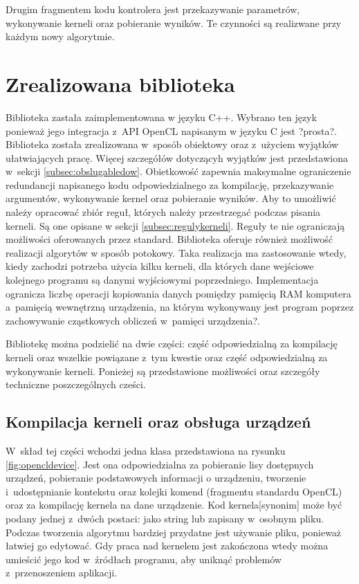 Drugim fragmentem kodu kontrolera jest przekazywanie parametrów, wykonywanie kerneli oraz pobieranie wyników. Te czynności są realizwane przy każdym nowy algorytmie.

\section{Zrealizowana biblioteka}  
\label{sec:biblioteka}

Biblioteka zastała zaimplementowana w języku C++. Wybrano ten język ponieważ jego integracja z~API OpenCL napisanym w języku C jest ?prosta?. Biblioteka została zrealizowana w~sposób obiektowy oraz z~użyciem wyjątków ułatwiających pracę. Więcej szczegółów dotyczącyh wyjątków jest przedstawiona w~sekcji \ref{subsec:obslugabledow}. Obietkowość zapewnia maksymalne ograniczenie redundancji napisanego kodu odpowiedzialnego za kompilację, przekazywanie argumentów, wykonywanie kernel oraz pobieranie wyników. Aby to umożliwić należy opracować zbiór reguł, których należy przestrzegać podczas pisania kerneli. Są one opisane w sekcji \ref{subsec:regulykerneli}. Reguły te nie ograniczają możliwości oferowanych przez standard. Biblioteka oferuje również możliwość realizacji algorytów w sposób potokowy. Taka realizacja ma zastosowanie wtedy, kiedy zachodzi potrzeba użycia kilku kerneli, dla których dane wejściowe kolejnego programu są danymi wyjściowymi poprzedniego. Implementacja  ogranicza liczbę operacji kopiowania danych pomiędzy pamięcią RAM komputera a~pamięcią wewnętrzną urządzenia, na którym wykonywany jest program poprzez zachowywanie cząstkowych obliczeń w~pamięci urządzenia?.

Bibliotekę można podzielić na dwie części: część odpowiedzialną za kompilację kerneli oraz wszelkie powiązane z~tym kwestie oraz część odpowiedzialną za wykonywanie kerneli.
Ponieżej są przedstawione możliwości oraz szczegóły techniczne poszczególnych cześci.

\subsection{Kompilacja kerneli oraz obsługa urządzeń}
\label{subsec:kompilacjakerneli}
W~skład tej części wchodzi jedna klasa przedstawiona na rysunku \ref{fig:opencldevice}. Jest ona odpowiedzialna za pobieranie lisy dostępnych urządzeń, pobieranie podstawowych informacji o urządzeniu, tworzenie i~udostępnianie kontekstu oraz kolejki komend (fragmentu standardu OpenCL) oraz za kompilację kernela na dane urządzenie. Kod kernela[synonim] może być podany jednej z~dwóch postaci: jako string lub zapisany w~osobnym pliku. Podczas tworzenia algorytmu bardziej przydatne jest używanie pliku, ponieważ łatwiej go edytować. Gdy praca nad kernelem jest zakończona wtedy można umieścić jego kod w~źródłach programu, aby uniknąć problemów z~przenoszeniem aplikacji.

